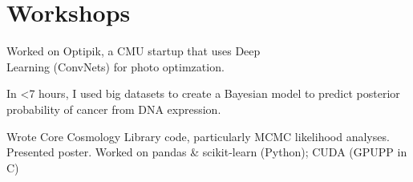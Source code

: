 \documentclass[]{deedy-resume-openfont}
\begin{document}
\section{\color{Blue} Workshops}
\begin{minipage}{0.5\textwidth} 
Worked on Optipik, a CMU startup that uses Deep\\ Learning (ConvNets) for photo optimzation.
\sectionsep


In <7 hours, I used big datasets to create a Bayesian model to predict posterior probability of cancer from DNA expression.
\sectionsep



\end{minipage}%
\begin{minipage}{0.5\textwidth}
Wrote Core Cosmology Library code, particularly MCMC likelihood analyses.
\sectionsep
{}
Presented poster. Worked on pandas \& scikit-learn (Python); CUDA (GPUPP in C)
\sectionsep

\end{minipage}



\end{document}
